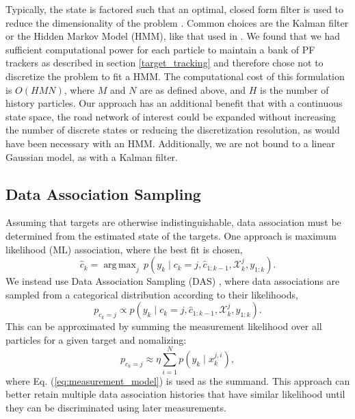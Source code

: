 \documentclass[letterpaper, 10 pt, conference]{ieeeconf}  %
\DeclareMathOperator*{\argmax}{arg\,max}
\begin{document}
Typically, the state is factored such that an optimal, closed form filter is used to reduce the dimensionality of the problem \cite{Doucet2000a}. Common choices are the Kalman filter or the Hidden Markov Model (HMM), like that used in \cite{Ahmed2017}. We found that we had sufficient computational power for each particle to maintain a bank of PF trackers as described in section \ref{target_tracking} and therefore chose not to discretize the problem to fit a HMM. The computational cost of this formulation is $O(HMN)$, where $M$ and $N$ are as defined above, and $H$ is the number of history particles. Our approach has an additional benefit that with a continuous state space, the road network of interest could be expanded without increasing the number of discrete states or reducing the discretization resolution, as would have been necessary with an HMM. Additionally, we are not bound to a linear Gaussian model, as with a Kalman filter.

\subsection{Data Association Sampling}\label{data_association_sampling}

Assuming that targets are otherwise indistinguishable, data association must be determined from the estimated state of the targets. One approach is maximum likelihood (ML) association, where the best fit is chosen,
\begin{equation}%
    \hat{c}_k = \argmax_{j} \, p(y_k \mid c_k = j, \hat{c}_{1:k-1}, \mathcal{X}^{j}_{k}, y_{1:k}).
\end{equation}
We instead use Data Association Sampling (DAS) \cite{Thrun2006}, where data associations are sampled from a categorical distribution according to their likelihoods,
\begin{equation}%
    p_{c_k=j} \propto p(y_k \mid c_k=j, \hat{c}_{1:k-1}, \mathcal{X}^{j}_{k}, y_{1:k}).
\end{equation}
This can be approximated by summing the measurement likelihood over all particles for a given target and nomalizing:
\begin{equation}%
    p_{c_k=j} \approx \eta \sum_{i=1}^{N} p(y_k \mid x_k^{j, i}),
\end{equation}
where Eq. (\ref{eq:measurement_model}) is used as the summand. This approach can better retain multiple data association histories that have similar likelihood until they can be discriminated using later measurements.
\end{document}
